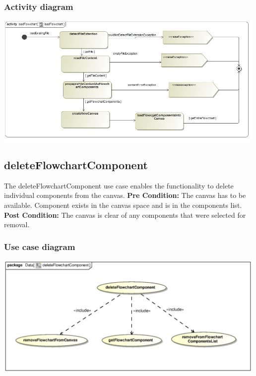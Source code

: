 \documentclass[11pt,a4paper,titlepage]{article}
\begin{document}
\subsubsection{Activity diagram}
\includegraphics[width=500px]{loadFlowchart_activity_diagram.jpg}


\subsection{deleteFlowchartComponent}
The deleteFlowchartComponent use case enables the functionality to delete individual components from the canvas.
\newline\newline
\textbf{Pre Condition:} The canvas has to be available. Component exists in the canvas space and is in the components list.
\newline\newline
\textbf{Post Condition:} The canvas is clear of any components that were selected for removal.

\subsubsection{Use case diagram}
\includegraphics[width=500px]{deleteFlowchartComponentUseCase.eps}
\end{document}
